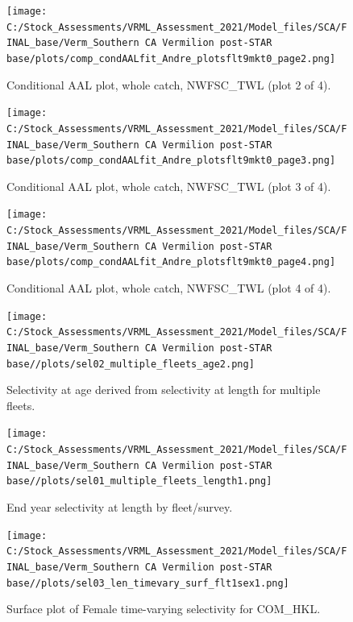\documentclass[11pt,
  english,
]{article}
\begin{document}
\begin{figure}
\centering
\texttt{[image: C:/Stock\_Assessments/VRML\_Assessment\_2021/Model\_files/SCA/FINAL\_base/Verm\_Southern CA Vermilion post-STAR base/plots/comp\_condAALfit\_Andre\_plotsflt9mkt0\_page2.png]}
\caption{Conditional AAL plot, whole catch, NWFSC\_TWL (plot 2 of 4).\label{fig:comp_condAALfit_Andre_plotsflt9mkt0_page2}}
\end{figure}

\begin{figure}
\centering
\texttt{[image: C:/Stock\_Assessments/VRML\_Assessment\_2021/Model\_files/SCA/FINAL\_base/Verm\_Southern CA Vermilion post-STAR base/plots/comp\_condAALfit\_Andre\_plotsflt9mkt0\_page3.png]}
\caption{Conditional AAL plot, whole catch, NWFSC\_TWL (plot 3 of 4).\label{fig:comp_condAALfit_Andre_plotsflt9mkt0_page3}}
\end{figure}

\begin{figure}
\centering
\texttt{[image: C:/Stock\_Assessments/VRML\_Assessment\_2021/Model\_files/SCA/FINAL\_base/Verm\_Southern CA Vermilion post-STAR base/plots/comp\_condAALfit\_Andre\_plotsflt9mkt0\_page4.png]}
\caption{Conditional AAL plot, whole catch, NWFSC\_TWL (plot 4 of 4).\label{fig:comp_condAALfit_Andre_plotsflt9mkt0_page4}}
\end{figure}

\clearpage
\FloatBarrier

\FloatBarrier

\begin{figure}
\centering
\texttt{[image: C:/Stock\_Assessments/VRML\_Assessment\_2021/Model\_files/SCA/FINAL\_base/Verm\_Southern CA Vermilion post-STAR base//plots/sel02\_multiple\_fleets\_age2.png]}
\caption{Selectivity at age derived from selectivity at length for multiple fleets.\label{fig:selex-age-all}}
\end{figure}

\FloatBarrier

\begin{figure}
\centering
\texttt{[image: C:/Stock\_Assessments/VRML\_Assessment\_2021/Model\_files/SCA/FINAL\_base/Verm\_Southern CA Vermilion post-STAR base//plots/sel01\_multiple\_fleets\_length1.png]}
\caption{End year selectivity at length by fleet/survey.\label{fig:selex-length-all}}
\end{figure}

\FloatBarrier

\begin{figure}
\centering
\texttt{[image: C:/Stock\_Assessments/VRML\_Assessment\_2021/Model\_files/SCA/FINAL\_base/Verm\_Southern CA Vermilion post-STAR base//plots/sel03\_len\_timevary\_surf\_flt1sex1.png]}
\caption{Surface plot of Female time-varying selectivity for COM\_HKL.\label{fig:sel03_len_timevary_surf_flt1sex1}}
\end{figure}
\end{document}
